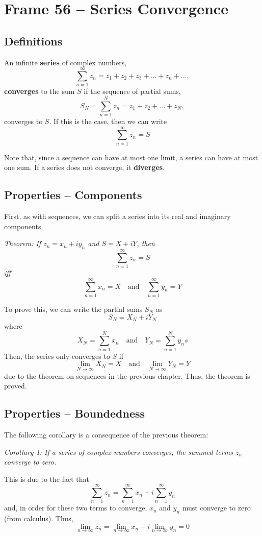 \documentclass{article}
\renewcommand{\emph}{\textbf}
\begin{document}
\clearpage
\section{Frame 56 -- Series Convergence}
\subsection{Definitions}
An infinite \emph{series} of complex numbers,
\[
	\sum_{n=1}^\infty z_n = z_1 + z_2 + z_3 + \dots + z_n + \dots,
\]
\emph{converges} to the sum $S$ if the sequence of partial sums,
\[
	S_N = \sum_{n=1}^N z_n = z_1 + z_2 + \dots + z_N,
\]
converges to $S$. If this is the case, then we can write
\[
	\sum_{n=1}^\infty z_n = S
\]

Note that, since a sequence can have at most one limit, a series can have at most one sum. If a series does not converge, it \emph{diverges}.

\subsection{Properties -- Components}
First, as with sequences, we can split a series into its real and imaginary components.

\textit{Theorem: If $z_n = x_n + iy_n$ and $S = X + iY$, then
\[
	\sum_{n=1}^\infty z_n = S
\]
iff
\[
	\sum_{n=1}^\infty x_n = X \quad \text{and} \quad \sum_{n=1}^\infty y_n = Y
\]}

To prove this, we can write the partial sums $S_N$ as
\[
	S_N = X_N + iY_N
\]
where
\[
	X_N = \sum_{n=1}^N x_n \quad \text{and} \quad Y_N = \sum_{n=1}^N y_ns
\]
Then, the series only converges to $S$ if
\[
	\lim_{N \to \infty} X_N = X \quad \text{and} \quad \lim_{N \to \infty} Y_N = Y
\]
due to the theorem on sequences in the previous chapter. Thus, the theorem is proved.

\subsection{Properties -- Boundedness}
The following corollary is a consequence of the previous theorem: 

\textit{Corollary 1: If a series of complex numbers converges, the summed terms $z_n$ converge to zero.}

This is due to the fact that
\[
	\sum_{n=1}^\infty z_n = \sum_{n=1}^\infty x_n + i \sum_{n=1}^\infty y_n
\]
and, in order for these two terms to converge, $x_n$ and $y_n$ must converge to zero (from calculus). Thus,
\[
	\lim_{n \to \infty} z_n 
	= \lim_{n \to \infty} x_n + i \lim_{n \to \infty} y_n
	= 0
\]
\end{document}
